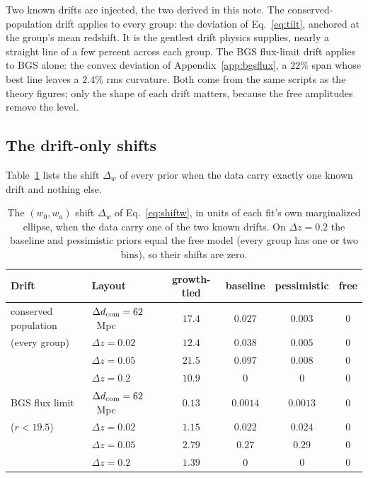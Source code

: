 \documentclass[11pt]{article}
\begin{document}
Two known drifts are injected, the two derived in this note.  The
conserved-population drift applies to every group: the deviation of
Eq.~\eqref{eq:tilt}, anchored at the group's mean redshift.  It is
the gentlest drift physics supplies, nearly a straight line of a few
percent across each group.  The BGS flux-limit drift applies to BGS
alone: the convex deviation of Appendix~\ref{app:bgsflux}, a $22\%$
span whose best line leaves a $2.4\%$ rms curvature.  Both come from
the same scripts as the theory figures; only the shape of each drift
matters, because the free amplitudes remove the level.

\subsection{The drift-only shifts}
\label{sec:biasresults}

Table~\ref{tab:ladderbias} lists the shift $\Delta_w$ of every prior
when the data carry exactly one known drift and nothing else.

\begin{table}[ht]
  \centering
  \begin{tabular}{llcccc}
    \hline
    Drift & Layout & growth-tied & baseline & pessimistic & free \\
    \hline
    conserved population & $\Delta d_{\rm com} = 62$~Mpc &
    $17.4$ & $0.027$ & $0.003$ & $0$ \\
    (every group) & $\Delta z = 0.02$ &
    $12.4$ & $0.038$ & $0.005$ & $0$ \\
    & $\Delta z = 0.05$ & $21.5$ & $0.097$ & $0.008$ & $0$ \\
    & $\Delta z = 0.2$  & $10.9$ & $0$ & $0$ & $0$ \\
    \hline
    BGS flux limit & $\Delta d_{\rm com} = 62$~Mpc &
    $0.13$ & $0.0014$ & $0.0013$ & $0$ \\
    ($r < 19.5$) & $\Delta z = 0.02$ &
    $1.15$ & $0.022$ & $0.024$ & $0$ \\
    & $\Delta z = 0.05$ & $2.79$ & $0.27$ & $0.29$ & $0$ \\
    & $\Delta z = 0.2$  & $1.39$ & $0$ & $0$ & $0$ \\
    \hline
  \end{tabular}
  \caption{The $(w_0, w_a)$ shift $\Delta_w$ of
    Eq.~\eqref{eq:shiftw}, in units of each fit's own marginalized
    ellipse, when the data carry one of the two known drifts.  On
    $\Delta z = 0.2$ the baseline and pessimistic priors equal the
    free model (every group has one or two bins), so their
    shifts are zero.}
  \label{tab:ladderbias}
\end{table}
\end{document}
